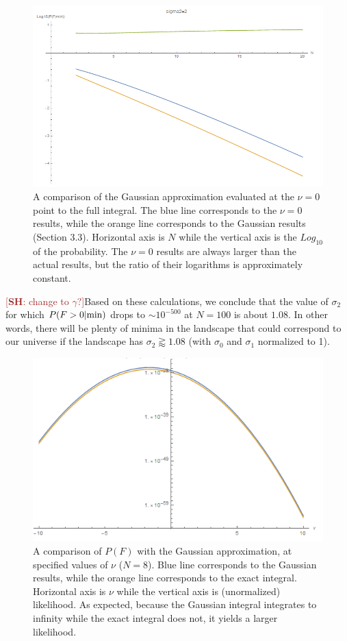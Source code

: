 \documentclass[12pt]{article}
\newcommand{\SH}[1]{\textcolor{brown}{[{\bf SH}: #1]}}
\begin{document}
\begin{figure} 
  \centering
  \includegraphics[width=\linewidth]{sigma2=2v=0.png}
  \caption{A comparison of the Gaussian approximation evaluated at the $\nu=0$ point to the full integral. The blue line corresponds to the $\nu=0$ results, while the orange line corresponds to the Gaussian results (Section 3.3). Horizontal axis is $N$ while the vertical axis is the $Log_{10}$ of the probability. The $\nu=0$ results are always larger than the actual results, but the ratio of their logarithms is approximately constant.}
  \label{sigma2=2v=0}
\end{figure}

\SH{change to $\gamma?$}Based on these calculations, we conclude that the value of $\sigma_2$ for which $P(F>0|{\rm min})$ drops to $\sim 10^{-500}$ at $N = 100$ is about $1.08$. In other words, there will be plenty of minima in the landscape that could correspond to our universe if the landscape has $\sigma_2 \gtrapprox 1.08$ (with $\sigma_0$ and $\sigma_1$ normalized to 1).

\begin{figure} 
  \centering
  \includegraphics[width=\linewidth]{Comparison.png}
  \caption{A comparison of $P(F)$ with the Gaussian approximation, at specified values of $\nu$ ($N=8$). Blue line corresponds to the Gaussian results, while the orange line corresponds to the exact integral. Horizontal axis is $\nu$ while the vertical axis is (unormalized) likelihood. As expected, because the Gaussian integral integrates to infinity while the exact integral does not, it yields a larger likelihood.}
  \label{Comparison}
\end{figure}
\end{document}
